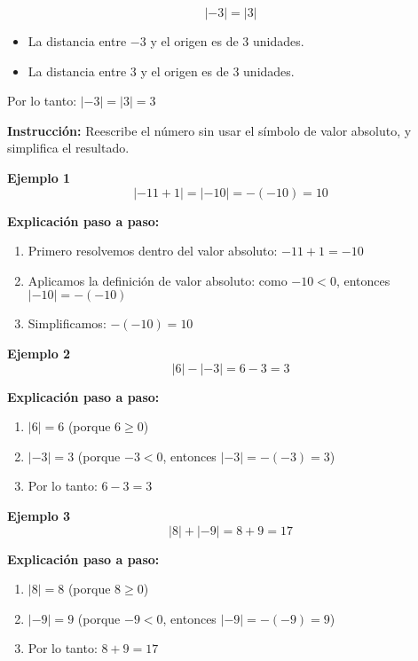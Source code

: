 $$|-3| = |3|$$

\begin{itemize}
    \item La distancia entre $-3$ y el origen es de 3 unidades.
    \item La distancia entre $3$ y el origen es de 3 unidades.
\end{itemize}

Por lo tanto: $|-3| = |3| = 3$


\textbf{Instrucción:} Reescribe el número sin usar el símbolo de valor absoluto, y simplifica el resultado.

\begin{example}
\textbf{Ejemplo 1}
$$|-11 + 1| = |-10| = -(-10) = 10$$

\textbf{Explicación paso a paso:}
\begin{enumerate}
    \item Primero resolvemos dentro del valor absoluto: $-11 + 1 = -10$
    \item Aplicamos la definición de valor absoluto: como $-10 < 0$, entonces $|-10| = -(-10)$
    \item Simplificamos: $-(-10) = 10$
\end{enumerate}
\end{example}

\begin{example}
\textbf{Ejemplo 2}
$$|6| - |-3| = 6 - 3 = 3$$

\textbf{Explicación paso a paso:}
\begin{enumerate}
    \item $|6| = 6$ (porque $6 \geq 0$)
    \item $|-3| = 3$ (porque $-3 < 0$, entonces $|-3| = -(-3) = 3$)
    \item Por lo tanto: $6 - 3 = 3$
\end{enumerate}
\end{example}

\begin{example}
\textbf{Ejemplo 3}
$$|8| + |-9| = 8 + 9 = 17$$

\textbf{Explicación paso a paso:}
\begin{enumerate}
    \item $|8| = 8$ (porque $8 \geq 0$)
    \item $|-9| = 9$ (porque $-9 < 0$, entonces $|-9| = -(-9) = 9$)
    \item Por lo tanto: $8 + 9 = 17$
\end{enumerate}
\end{example}

